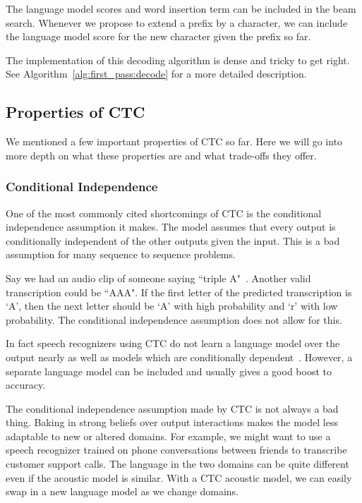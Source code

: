 The language model scores and word insertion term can be included in the beam
search. Whenever we propose to extend a prefix by a character, we can include
the language model score for the new character given the prefix so far.

The implementation of this decoding algorithm is dense and tricky to get right.
See Algorithm~\ref{alg:first_pass:decode} for a more detailed description.

\subsection{Properties of CTC}

We mentioned a few important properties of CTC so far. Here we will go into
more depth on what these properties are and what trade-offs they offer.

\subsubsection{Conditional Independence}

One of the most commonly cited shortcomings of CTC is the conditional
independence assumption it makes. The model assumes that every output is
conditionally independent of the other outputs given the input. This is a bad
assumption for many sequence to sequence problems.

Say we had an audio clip of someone saying ``triple A"~\cite{chan2016}. Another
valid transcription could be ``AAA". If the first letter of the predicted
transcription is `A', then the next letter should be `A' with high probability
and `r' with low probability. The conditional independence assumption does not
allow for this.

In fact speech recognizers using CTC do not learn a language model over the
output nearly as well as models which are conditionally
dependent~\cite{battenberg2017}. However, a separate language model can be
included and usually gives a good boost to accuracy.

The conditional independence assumption made by CTC is not always a bad thing.
Baking in strong beliefs over output interactions makes the model less
adaptable to new or altered domains. For example, we might want to use a speech
recognizer trained on phone conversations between friends to transcribe
customer support calls. The language in the two domains can be quite different
even if the acoustic model is similar. With a CTC acoustic model, we can easily
swap in a new language model as we change domains.

